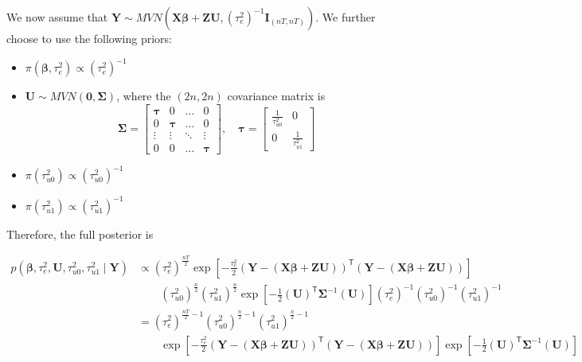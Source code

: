 \documentclass{article}
\begin{document}
We now assume that $\mathbf{Y} \sim MVN \left( \mathbf{X}\boldsymbol{\beta}+\mathbf{ZU}, \left( \tau_e^2 \right)^{-1} \mathbf{I}_{(nT,nT)} \right)$. We further choose to use the following priors:

\begin{itemize}
	\item $\pi \left( \boldsymbol{\beta}, \tau_e^2 \right) \propto \left( \tau_e^2 \right) ^{-1}$
    \item $\mathbf{U} \sim MVN \left( \mathbf{0}, \boldsymbol{\Sigma} \right)$, where the $(2n,2n)$ covariance matrix is
$$\boldsymbol{\Sigma} = \begin{bmatrix}
    \boldsymbol{\tau} & 0 & \hdots & 0 \\
    0 & \boldsymbol{\tau}  & \hdots & 0 \\
  	\vdots & \vdots & \ddots & \vdots \\ 
    0 & 0 & \hdots & \boldsymbol{\tau} 
\end{bmatrix},
\quad
\boldsymbol{\tau} = 
\begin{bmatrix}
    \frac{1}{\tau_{u0}^2} & 0 \\ 
    0 &  \frac{1}{\tau_{u1}^2}
\end{bmatrix}
$$
    \item $\pi \left( \tau_{u0}^2 \right) \propto \left( \tau_{u0}^2 \right) ^{-1}$
    \item $\pi \left( \tau_{u1}^2 \right) \propto \left( \tau_{u1}^2 \right) ^{-1}$
\end{itemize}

Therefore, the full posterior is

\begin{align*}
p \left( \boldsymbol{\beta}, \tau_e^2, \mathbf{U}, \tau_{u0}^2, \tau_{u1}^2 \mid \mathbf{Y} \right) & \propto \left( \tau_e^2 \right)^{\frac{nT}{2}} \exp \left[ -\frac{\tau_e^2}{2} \left( \mathbf{Y} - \left( \mathbf{X}\boldsymbol{\beta}+\mathbf{ZU} \right) \right)^{\mathsf{T}} \left( \mathbf{Y}- \left( \mathbf{X}\boldsymbol{\beta}+\mathbf{ZU} \right) \right) \right] \\
&\qquad \left( \tau_{u0}^2 \right)^{\frac{n}{2}} \left( \tau_{u1}^2 \right)^{\frac{n}{2}} \exp \left[-\frac{1}{2} \left( \mathbf{U} \right)^{\mathsf{T}}\boldsymbol{\Sigma}^{-1}\left(\mathbf{U} \right) \right] \left( \tau_{e}^2 \right)^{-1} \left( \tau_{u0}^2 \right)^{-1} \left( \tau_{u1}^2 \right)^{-1} \\
&= \left( \tau_e^2 \right)^{\frac{nT}{2}-1} \left( \tau_{u0}^2 \right)^{\frac{n}{2}-1} \left( \tau_{u1}^2 \right)^{\frac{n}{2}-1} \\
&\qquad \exp \left[ -\frac{\tau_e^2}{2} \left( \mathbf{Y} - \left( \mathbf{X}\boldsymbol{\beta}+\mathbf{ZU} \right) \right)^{\mathsf{T}} \left( \mathbf{Y}- \left( \mathbf{X}\boldsymbol{\beta}+\mathbf{ZU} \right) \right) \right]   \exp \left[-\frac{1}{2} \left( \mathbf{U} \right)^{\mathsf{T}}\boldsymbol{\Sigma}^{-1}\left(\mathbf{U} \right) \right]
\end{align*}
\end{document}
